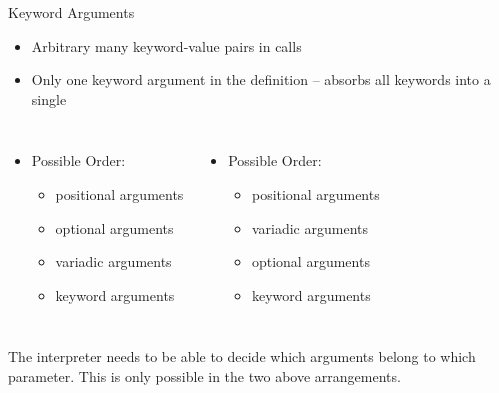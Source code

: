 \begin{frame}{Keyword Arguments}
%
\begin{itemize}
\item Arbitrary many keyword-value pairs in calls
\item Only one keyword argument in the definition -- absorbs all keywords into a single 
\end{itemize}
%
\begin{columns}[T]
\begin{itemize}
\item Possible Order:
	\begin{itemize}
	\item positional arguments
	\item optional arguments
	\item variadic arguments
	\item keyword arguments
	\end{itemize}
\end{itemize}
%
\begin{itemize}
\item Possible Order:
	\begin{itemize}
	\item positional arguments
	\item variadic arguments
	\item optional arguments
	\item keyword arguments
	\end{itemize}
\end{itemize}
\end{columns}

%
\begin{hintbox}
The interpreter needs to be able to decide which arguments belong to which parameter. This is only possible in the two above arrangements.
\end{hintbox}
%
\end{frame}


